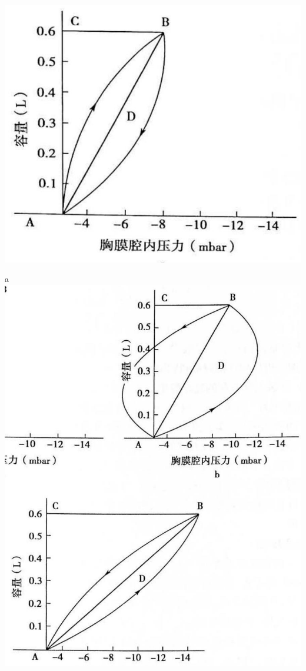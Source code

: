 \documentclass[10pt]{article}
\begin{document}
\begin{center}
\includegraphics[max width=\textwidth]{2024_07_09_002a177993bd97d1d6d7g-124}
\end{center}

a\\
\includegraphics[max width=\textwidth, center]{2024_07_09_002a177993bd97d1d6d7g-124(1)}
\end{document}
